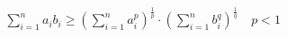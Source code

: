 \documentclass[preview]{standalone}
\begin{document}
\begin{align*}
& \sum_{i = 1}^n a_ib_i \geqslant \left(\sum_{i = 1}^{n}a_i^p\right)^{\frac{1}{p}} \cdot \left(\sum_{i = 1}^{n}b_i^q\right)^{\frac{1}{q}}  \quad p < 1
\end{align*}
\end{document}
